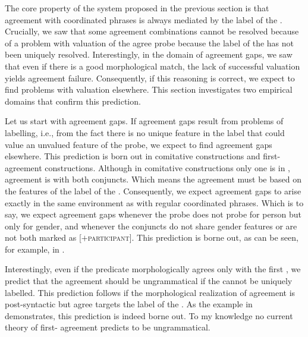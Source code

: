 \documentclass[output=paper,modfontsnewtxmath,hidelinks]{langscibook}
\begin{document}
The core property of the system proposed in the previous section is that agreement with coordinated  phrases is always mediated by the label of the . Crucially, we saw that some agreement combinations cannot be resolved because of a problem with valuation of the agree probe because the label of the  has not been uniquely resolved. Interestingly, in the domain of agreement gaps, we saw that even if there is a good morphological match, the lack of successful valuation yields agreement failure. Consequently, if this reasoning is correct, we expect to find problems with valuation elsewhere. This section investigates two empirical domains that confirm this prediction.

Let us start with agreement gaps. If agreement gaps result from problems of labelling, i.e., from the fact there is no unique feature in the label that could value an unvalued feature of the probe, we expect to find agreement gaps elsewhere. This prediction is born out in comitative constructions and first- agreement constructions. Although in comitative constructions only one  is in , agreement is with both conjuncts. Which means the agreement must be based on the features of the label of the . Consequently, we expect agreement gaps to arise exactly in the same environment as with regular coordinated phrases. Which is to say, we expect agreement gaps whenever the probe does not probe for person but only for gender, and whenever the conjuncts do not share gender features or are not both marked as [$+$\textsc{participant}]. This prediction is borne out, as can be seen, for example, in .

\z

\noindent Interestingly, even if the predicate morphologically agrees only with the first , we predict that the  agreement should be ungrammatical if the  cannot be uniquely labelled. This prediction follows if the morphological realization of agreement is post-syntactic but agree targets the label of the . As the example in  demonstrates, this prediction is indeed borne out. To my knowledge no current theory of first- agreement predicts  to be ungrammatical.
\end{document}

